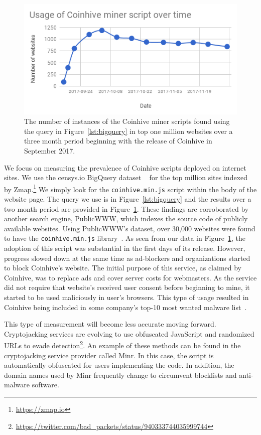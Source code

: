 \begin{figure}[t]
\centering
\includegraphics[width=\linewidth]{figures/usage_of_coinhive_over_time.png}
\caption{The number of instances of the Coinhive miner scripts found using the query in Figure~\ref{lst:bigquery} in top one million websites over a three month period beginning with the release of Coinhive in September 2017.\label{fig:topmil}}
\end{figure}

We focus on measuring the prevalence of Coinhive scripts deployed on internet sites. We use the censys.io BigQuery dataset ~\cite{censys15} for the top million sites indexed by Zmap.\footnote{\url{https://zmap.io}} We simply look for the \texttt{coinhive.min.js} script within the body of the website page. The query we use is in Figure~\ref{lst:bigquery} and the results over a two month period are provided in Figure~\ref{fig:topmil}. These findings are corroborated by another search engine, PublicWWW, which indexes the source code of publicly available websites. Using PublicWWW's dataset, over 30,000 websites were found to have the \texttt{coinhive.min.js} library~\cite{badpacketspublicwww}. As seen from our data in Figure~\ref{fig:topmil}, the adoption of this script was substantial in the first days of its release. However, progress slowed down at the same time as ad-blockers and organizations started to block Coinhive's website. The initial purpose of this service, as claimed by Coinhive, was to replace ads and cover server costs for webmasters. As the service did not require that website's received user consent before beginning to mine, it started to be used maliciously in user's browsers. This type of usage resulted in Coinhive being included in some company's top-10 most wanted malware list~\cite{checkpoint}.

This type of measurement will become less accurate moving forward. Cryptojacking services are evolving to use obfuscated JavaScript and randomized URLs to evade detection\footnote{\url{https://twitter.com/bad_packets/status/940333744035999744}}. An example of these methods can be found in the cryptojacking service provider called Minr. In this case, the script is automatically obfuscated for users implementing the code. In addition, the domain names used by Minr frequently change to circumvent blocklists and anti-malware software.

